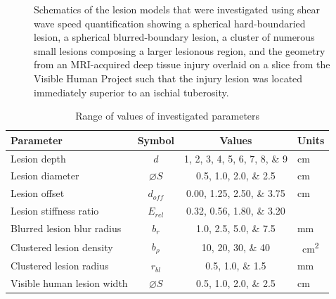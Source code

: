 \begin{figure}[!htb]
{
					\label{fig:shear_schematic_human}
				}
				\caption[Schematic of shear wave speed quantification-investigated lesions]{Schematics of the lesion models that were investigated using shear wave speed quantification showing \protect{} a spherical hard-boundaried lesion, \protect{} a spherical blurred-boundary lesion, \protect{} a cluster of numerous small lesions composing a larger lesionous region, and \protect{} the geometry from an MRI-acquired deep tissue injury overlaid on a slice from the Visible Human Project such that the injury lesion was located immediately superior to an ischial tuberosity.}	
				\label{fig:shear_schematics}
			\end{figure}

			\begin{table}[!htb]
				\centering
				\caption[Shear wave speed quantification model investigated parameters]{Range of values of investigated parameters}
				\label{tab:shear-parametervalues}
				\begin{tabular}{lccs[table-unit-alignment = left]}
					\toprule
					Parameter & Symbol & Values & Units \\
					\midrule
					Lesion depth & $d$ & \numlist{1;2;3;4;5;6;7;8;9} & \si{\cm} \\
					Lesion diameter & $\diameter S$ & \numlist{0.5;1.0;2.0;2.5} & \si{\cm} \\
					Lesion offset & $d_{off}$ & \numlist{0.00;1.25;2.50;3.75} & \si{\cm} \\
					Lesion stiffness ratio & $E_{rel}$ & \numlist{0.32;0.56;1.80;3.20} & \\
					Blurred lesion blur radius & $b_r$ & \numlist{1.0;2.5;5.0;7.5} & \si{\mm} \\
					Clustered lesion density & $b_\rho$ & \numlist{10;20;30;40} & \si{\per\cm\squared} \\
					Clustered lesion radius & $r_{bl}$ & \numlist{0.5;1.0;1.5} & \si{\mm} \\
					Visible human lesion width & $\diameter S$ & \numlist{0.5;1.0;2.0;2.5} & \si{\cm} \\
					\bottomrule
				\end{tabular}
			\end{table}

